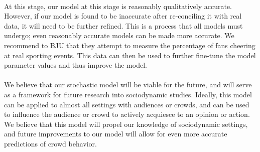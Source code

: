 \documentclass[oneside,12pt]{report}
\begin{document}
\paragraph{}
At this stage, our model at this stage is reasonably qualitatively accurate. However, if our model is found to be inaccurate after re-conciling it with real data, it will need to be further refined. This is a process that all models must undergo; even reasonably accurate models can be made more accurate. We recommend to BJU that they attempt to measure the percentage of fans cheering at real sporting events. This data can then be used to further fine-tune the model parameter values and thus improve the model.    
\paragraph{}   
We believe that our stochastic model will be viable for the future, and will serve as a framework for future research into sociodynamic studies. Ideally, this model can be applied to almost all settings with audiences or crowds, and can be used to influence the audience or crowd to actively acquiesce to an opinion or action. We believe that this model will propel our knowledge of sociodynamic settings, and future improvements to our model will allow for even more accurate predictions of crowd behavior. 
 
\end{document}

